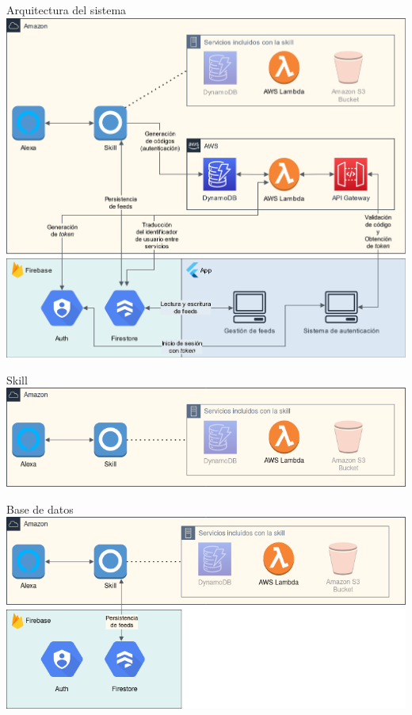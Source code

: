 \documentclass{beamer}
\begin{document}
  \begin{frame}{Arquitectura del sistema}
    \includegraphics[width=.9\textwidth]{diagrama-bloques.png}  
  \end{frame}

  \begin{frame}{Skill}
    \includegraphics[width=\textwidth]{bloques-skill.png}  
  \end{frame}

  \begin{frame}{Base de datos}
    \includegraphics[width=\textwidth]{bloques-bd.png}  
  \end{frame}
\end{document}
